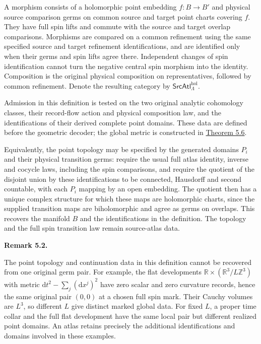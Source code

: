 \documentclass[
  english,
  11pt,
  reqno]{amsart}
\makeatletter
\newcommand{\pandocstatementheading}[1]{%
  \par\addpenalty{\@beginparpenalty}%
  \addvspace{.5\baselineskip plus .2\baselineskip minus .2\baselineskip}%
  {\normalfont\bfseries #1\par}%
  \nobreak\@afterindenttrue\@afterheading
}
\makeatother
\begin{document}
A morphism consists of a holomorphic point embedding \(f:B\to B'\) and
physical source comparison germs on common source and target point
charts covering \(f\). They have full spin lifts and commute with the
source and target overlap comparisons. Morphisms are compared on a
common refinement using the same specified source and target refinement
identifications, and are identified only when their germs and spin lifts
agree there. Independent changes of spin identification cannot turn the
negative central spin morphism into the identity. Composition is the
original physical composition on representatives, followed by common
refinement. Denote the resulting category by
\(\mathsf{SrcAtl}^{\mathrm{hol}}_\Lambda\).

Admission in this definition is tested on the two original analytic
cohomology classes, their record-flow action and physical composition
law, and the identifications of their derived complete point domains.
These data are defined before the geometric decoder; the global metric
is constructed in
\hyperref[thm:original-source-atlas-operator-equivalence]{Theorem 5.6}.

Equivalently, the point topology may be specified by the generated
domains \(P_i\) and their physical transition germs: require the usual
full atlas identity, inverse and cocycle laws, including the spin
comparisons, and require the quotient of the disjoint union by these
identifications to be connected, Hausdorff and second countable, with
each \(P_i\) mapping by an open embedding. The quotient then has a
unique complex structure for which these maps are holomorphic charts,
since the supplied transition maps are biholomorphic and agree as germs
on overlaps. This recovers the manifold \(B\) and the identifications in
the definition. The topology and the full spin transition law remain
source-atlas data.

\pandocstatementheading{\protect{}\label{rem:global-source-continuation-v08}Remark 5.2.}

The point topology and continuation data in this definition cannot be
recovered from one original germ pair. For example, the flat
developments \(\mathbb R\times(\mathbb R^3/L\mathbb Z^3)\) with metric
\(\mathrm dt^2-\sum_j(\mathrm dx^j)^2\) have zero scalar and zero
curvature records, hence the same original pair \((0,0)\) at a chosen
full spin mark. Their Cauchy volumes are \(L^3\), so different \(L\)
give distinct marked global data. For fixed \(L\), a proper time collar
and the full flat development have the same local pair but different
realized point domains. An atlas retains precisely the additional
identifications and domains involved in these examples.
\end{document}
